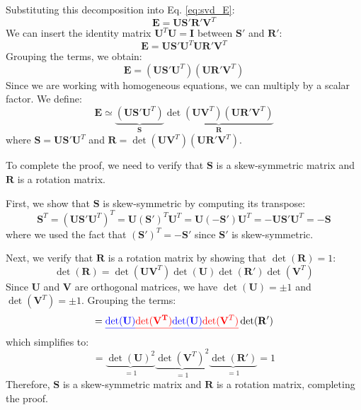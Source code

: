 \documentclass[11pt,a4paper]{article}
\theoremstyle{definition}
\theoremstyle{plain}
\theoremstyle{remark}
\begin{document}
Substituting this decomposition into Eq. \eqref{eq:svd_E}:
\begin{equation} \nonumber
    \mathbf{E} = \mathbf{U} \mathbf{S'} \mathbf{R'} \mathbf{V}^T
\end{equation}
We can insert the identity matrix $\mathbf{U}^T \mathbf{U} = \mathbf{I}$ between $\mathbf{S'}$ and $\mathbf{R'}$:
\begin{equation} \nonumber
    \mathbf{E} = \mathbf{U} \mathbf{S'} \mathbf{U}^T \mathbf{U} \mathbf{R'} \mathbf{V}^T
\end{equation}
Grouping the terms, we obtain:
\begin{equation} \nonumber
    \mathbf{E} = (\mathbf{U} \mathbf{S'} \mathbf{U}^T) (\mathbf{U} \mathbf{R'} \mathbf{V}^T)
\end{equation}
Since we are working with homogeneous equations, we can multiply by a scalar factor. We define:
\begin{equation} \label{eq:S_R_def}
    \mathbf{E} \simeq  \underbrace{(\mathbf{U} \mathbf{S'} \mathbf{U}^T)}_{\mathbf{S}} \underbrace{\det(\mathbf{U} \mathbf{V}^{T}) (\mathbf{U} \mathbf{R'} \mathbf{V}^T)}_{\mathbf{R}}
\end{equation}
where $\mathbf{S} = \mathbf{U} \mathbf{S'} \mathbf{U}^T$ and $\mathbf{R} = \det(\mathbf{U} \mathbf{V}^{T}) (\mathbf{U} \mathbf{R'} \mathbf{V}^T)$.

To complete the proof, we need to verify that $\mathbf{S}$ is a skew-symmetric matrix and $\mathbf{R}$ is a rotation matrix. 

First, we show that $\mathbf{S}$ is skew-symmetric by computing its transpose:
\begin{equation} \label{eq:S_skew}
    \mathbf{S}^T = (\mathbf{U} \mathbf{S'} \mathbf{U}^T)^T = \mathbf{U} (\mathbf{S'})^T \mathbf{U}^T = \mathbf{U} (-\mathbf{S'}) \mathbf{U}^T = -\mathbf{U} \mathbf{S'} \mathbf{U}^T = -\mathbf{S}
\end{equation}
where we used the fact that $(\mathbf{S'})^T = -\mathbf{S'}$ since $\mathbf{S'}$ is skew-symmetric.

Next, we verify that $\mathbf{R}$ is a rotation matrix by showing that $\det(\mathbf{R}) = 1$:
\begin{equation} \nonumber
    \det(\mathbf{R}) = \det(\mathbf{U} \mathbf{V}^T) \det(\mathbf{U}) \det(\mathbf{R'}) \det(\mathbf{V}^T) 
\end{equation}
Since $\mathbf{U}$ and $\mathbf{V}$ are orthogonal matrices, we have $\det(\mathbf{U}) = \pm 1$ and $\det(\mathbf{V}^T) = \pm 1$. Grouping the terms:
\begin{equation} \nonumber
    = \textcolor{blue}{\underline{\det(\mathbf{U})}} \textcolor{red}{\underline{\det(\mathbf{V^T})}} \textcolor{blue}{\underline{\det(\mathbf{U})}} \textcolor{red}{\underline{\det(\mathbf{V}^T)}} \det(\mathbf{R'})
\end{equation}
which simplifies to:
\begin{equation} \label{eq:R_rotation}
    = \underbrace{\det(\mathbf{U})^{2}}_{=1} \underbrace{\det(\mathbf{V}^T)^{2}}_{=1} \underbrace{\det(\mathbf{R'})}_{=1} = 1
\end{equation}
Therefore, $\mathbf{S}$ is a skew-symmetric matrix and $\mathbf{R}$ is a rotation matrix, completing the proof.
\end{document}
